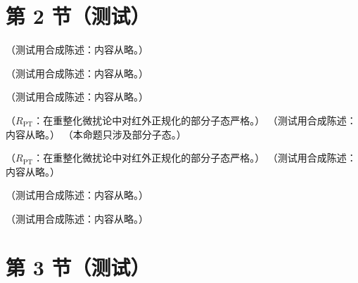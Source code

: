 \section{第 2 节（测试）}\label{sec:appM-bphz}

\begin{definition}\label{def:appM-normal-product}
（测试用合成陈述：内容从略。）
\end{definition}

\begin{lemma}[收缩与桥]\label{lem:appM-contraction}
（测试用合成陈述：内容从略。）
\end{lemma}

\begin{lemma}[链展开恒等式]\label{lem:appM-chain-expansion}
（测试用合成陈述：内容从略。）
\end{lemma}

\begin{theorem}\label{thm:appM-zimmermann-identity}
（$R_{\mathrm{PT}}$：在重整化微扰论中对红外正规化的部分子态严格。）
（测试用合成陈述：内容从略。）
（本命题只涉及部分子态。）
\end{theorem}

\begin{corollary}\label{cor:appM-reduction}
（$R_{\mathrm{PT}}$：在重整化微扰论中对红外正规化的部分子态严格。）
（测试用合成陈述：内容从略。）
\end{corollary}

\begin{example}\label{ex:appM-callan-symanzik}
（测试用合成陈述：内容从略。）
\end{example}

\begin{lemma}[冻结 $q$ 时外动量分配的相容性]\label{lem:appM-routing}
（测试用合成陈述：内容从略。）
\end{lemma}

\section{第 3 节（测试）}\label{sec:appM-chain}

